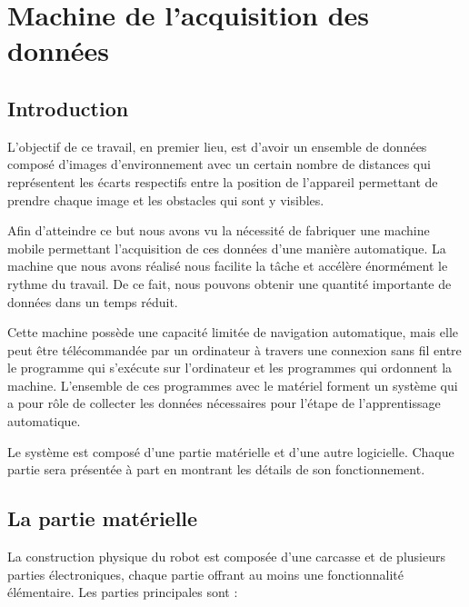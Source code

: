\chapter{Machine de l'acquisition des données}

\section{Introduction}

L'objectif de ce travail, en premier lieu, est d'avoir un ensemble de données
composé d'images d'environnement avec un certain nombre de distances qui
représentent  les écarts respectifs entre la position de l'appareil permettant
de prendre chaque image et les obstacles qui sont y visibles.

Afin d'atteindre ce but nous avons vu la nécessité de fabriquer une machine mobile
permettant l'acquisition de ces données d'une manière automatique. La machine que
nous avons réalisé nous facilite la tâche et accélère énormément le rythme du travail.
De ce fait, nous pouvons obtenir une quantité importante de données dans un temps
réduit.

Cette machine possède une capacité limitée de navigation automatique, mais
elle peut être télécommandée par un ordinateur à travers une connexion sans fil
entre le programme qui s'exécute sur l'ordinateur et les programmes qui ordonnent
la machine. L'ensemble de ces programmes avec le matériel forment un système
qui a pour rôle de collecter les données nécessaires pour l'étape de
l'apprentissage automatique.

Le système est composé d'une partie matérielle et d'une autre logicielle. Chaque
partie sera présentée à part en montrant les détails de son fonctionnement.

\section{La partie matérielle}

La construction physique du robot est composée d'une carcasse et de plusieurs
parties électroniques, chaque partie offrant au moins une fonctionnalité
élémentaire. Les parties principales sont :

